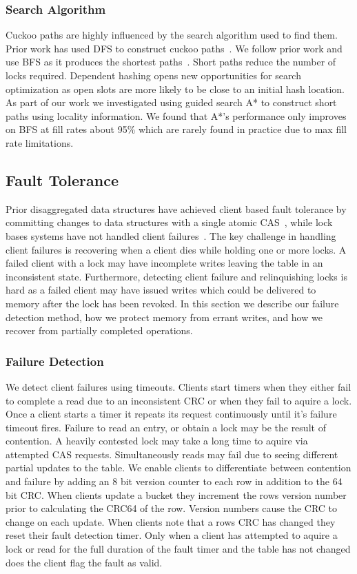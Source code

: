 \subsubsection{Search Algorithm} 

Cuckoo paths are highly influenced by the search algorithm 
used to find them. Prior work has used DFS to construct 
cuckoo paths~\cite{pilaf,memc3}. We follow prior work and 
use BFS as it produces the shortest 
paths~\cite{cuckoo-improvements}. Short paths reduce the 
number of locks required. Dependent hashing opens new 
opportunities for search optimization as open slots are more
likely to be close to an initial hash location. As part of
our work we investigated using guided search A* to construct
short paths using locality information. We found that A*'s
performance only improves on BFS at fill rates about 95\%
which are rarely found in practice due to max fill rate
limitations.

\subsection{Fault Tolerance}
\label{sec:fault-tolerance}

Prior disaggregated data structures have achieved client
based fault tolerance by committing changes to data
structures with a single atomic CAS~\cite{clover,race},
while lock bases systems have not handled client
failures~\cite{sherman}. The key challenge in handling
client failures is recovering when a client dies while
holding one or more locks. A failed client with a lock may
have incomplete writes leaving the table in an inconsistent
state. Furthermore, detecting client failure and
relinquishing locks is hard as a failed client may have
issued writes which could be delivered to memory after the
lock has been revoked. In this section we describe our
failure detection method, how we protect memory from errant
writes, and how we recover from partially completed operations.

\subsubsection{Failure Detection} We detect client failures
using timeouts. Clients start timers when they either fail
to complete a read due to an inconsistent CRC or when they
fail to aquire a lock. Once a client starts a timer it
repeats its request continuously until it's failure timeout
fires. Failure to read an entry, or obtain a lock may be the
result of contention. A heavily contested lock may take a
long time to aquire via attempted CAS requests.
Simultaneously reads may fail due to seeing different
partial updates to the table. We enable clients to
differentiate between contention and failure by adding an 8
bit version counter to each row in addition to the 64 bit
CRC. When clients update a bucket they increment the rows
version number prior to calculating the CRC64 of the row.
Version numbers cause the CRC to change on each update. When
clients note that a rows CRC has changed they reset their
fault detection timer. Only when a client has attempted to
aquire a lock or read for the full duration of the fault
timer and the table has not changed does the client flag the
fault as valid.

